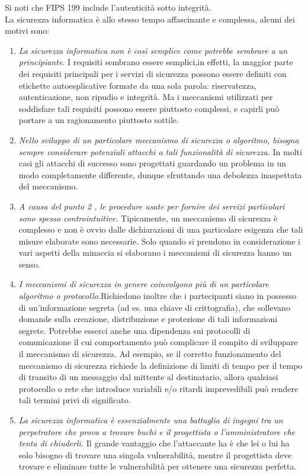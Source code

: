 Si noti che FIPS 199 include l'autenticità sotto integrità.\\

La sicurezza informatica è allo stesso tempo affascinante e complessa, alcuni dei motivi sono:
\begin{enumerate}
      \item \textit{La sicurezza informatica non è così semplice come potrebbe sembrare a un principiante}. I requisiti sembrano essere semplici,in effetti, la maggior parte dei requisiti principali per i servizi di sicurezza possono essere definiti con etichette autoesplicative formate da una sola parola: riservatezza, autenticazione, non ripudio e integrità. Ma i meccanismi utilizzati per soddisfare tali requisiti possono essere piuttosto complessi, e capirli può portare a un ragionamento piuttosto sottile.
      \item \textit{Nello sviluppo di un particolare meccanismo di sicurezza o algoritmo, bisogna sempre considerare potenziali attacchi a tali funzionalità di sicurezza.} In molti casi gli attacchi di successo sono progettati guardando un problema in un modo completamente differente, dunque sfruttando una debolezza inaspettata del meccanismo.
      \item \textit{A causa del punto 2 , le procedure usate per fornire dei servizi particolari sono spesso controintuitive.} Tipicamente, un meccanismo di sicurezza è complesso e non è ovvio dalle dichiarazioni di una particolare esigenza che tali misure elaborate sono necessarie. Solo quando si prendono in considerazione i vari aspetti della minaccia si elaborano i meccanismi di sicurezza hanno un senso.
      \item \textit{I meccanismi di sicurezza in genere coinvolgono più di un particolare algoritmo o
                  protocollo.}Richiedono inoltre che i partecipanti siano in possesso di un'informazione segreta (ad es. una chiave di crittografia), che sollevano domande sulla creazione, distribuzione e protezione di tali informazioni segrete. Potrebbe esserci anche una dipendenza sui protocolli di comunicazione il cui comportamento può complicare il compito di sviluppare il meccanismo di sicurezza. Ad esempio, se il corretto funzionamento del meccanismo di sicurezza richiede la definizione di limiti di tempo per il tempo di transito di un messaggio dal mittente al destinatario, allora qualsiasi protocollo o rete che introduce variabili e/o ritardi imprevedibili può rendere tali termini privi di significato.
      \item \textit{ La sicurezza informatica è essenzialmente una battaglia di ingegni tra un perpetratore che prova a  trovare buchi e il progettista o l'amministratore che tenta di chiuderli.} Il grande vantaggio che l'attaccante ha è che lei o lui ha solo bisogno di trovare una singola vulnerabilità, mentre il progettista deve trovare e eliminare tutte le vulnerabilità per ottenere una sicurezza perfetta.

\end{enumerate}
